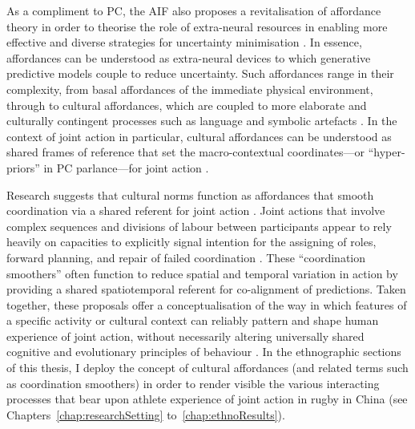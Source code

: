 \begin{CJK}{UTF8}{gbsn}
As a compliment to PC, the AIF also proposes a revitalisation of affordance theory \citep{Gibson1979} in order to theorise the role of extra-neural resources in enabling more effective and diverse strategies for uncertainty minimisation \citep{Friston2012}.  In essence, affordances can be understood as extra-neural devices to which generative predictive models couple to reduce uncertainty.  Such affordances range in their complexity, from basal affordances of the immediate physical environment, through to cultural affordances, which are coupled to more elaborate and culturally contingent processes such as language and symbolic artefacts \citep{Ramstead2016}.  In the context of joint action in particular, cultural affordances can be understood as shared frames of reference that set the macro-contextual coordinates---or ``hyper-priors'' in PC parlance---for joint action \citep{Clark2013}.

Research suggests that cultural norms function as affordances that smooth coordination via a shared referent for joint action \citep{Vesper2017}. Joint actions that involve complex sequences and divisions of labour between participants appear to rely heavily on capacities to explicitly signal intention for the assigning of roles, forward planning, and repair of failed coordination \citep{Frith2010}.  These ``coordination smoothers'' \citep{Vesper2017} often function to reduce spatial and temporal variation in action by providing a shared spatiotemporal referent for co-alignment of predictions. Taken together, these proposals offer a conceptualisation of the way in which features of a specific activity or cultural context can reliably pattern and shape human experience of joint action, without necessarily altering universally shared cognitive and evolutionary principles of behaviour \citep{Roepstorff2010}. In the ethnographic sections of this thesis, I deploy the concept of cultural affordances (and related terms such as coordination smoothers) in order to render visible the various interacting processes that bear upon athlete experience of joint action in rugby in China (see Chapters~\ref{chap:researchSetting} to~\ref{chap:ethnoResults}).


\end{CJK}
